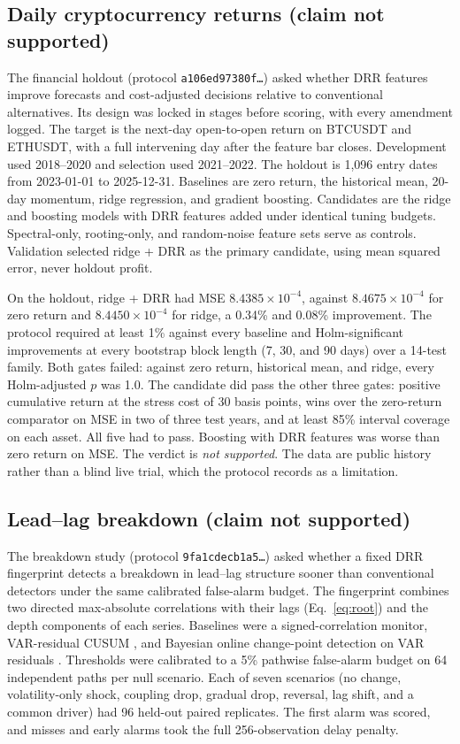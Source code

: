 \documentclass[10pt,twocolumn,letterpaper]{article}
\theoremstyle{definition}
\theoremstyle{remark}
\newcommand{\code}[1]{\texttt{#1}}
\begin{document}
\subsection{Daily cryptocurrency returns (claim not supported)}

The financial holdout (protocol \code{a106ed97380f\ldots}) asked whether DRR
features improve forecasts and cost-adjusted decisions relative to conventional
alternatives. Its design was locked in stages before scoring, with every
amendment logged. The target is the next-day open-to-open return on BTCUSDT and
ETHUSDT, with a full intervening day after the feature bar closes. Development
used 2018--2020 and selection used 2021--2022. The holdout is 1,096 entry dates
from 2023-01-01 to 2025-12-31. Baselines are zero return, the historical mean,
20-day momentum, ridge regression, and gradient boosting. Candidates are the
ridge and boosting models with DRR features added under identical tuning
budgets. Spectral-only, rooting-only, and random-noise feature sets serve as
controls. Validation selected ridge + DRR as the primary candidate, using mean
squared error, never holdout profit.

On the holdout, ridge + DRR had MSE $8.4385\times10^{-4}$, against
$8.4675\times10^{-4}$ for zero return and $8.4450\times10^{-4}$ for ridge, a
0.34\% and 0.08\% improvement. The protocol required at least 1\% against every
baseline and Holm-significant improvements at every bootstrap block length (7,
30, and 90 days) over a 14-test family. Both gates failed: against zero return,
historical mean, and ridge, every Holm-adjusted $p$ was 1.0. The candidate did
pass the other three gates: positive cumulative return at the stress cost of 30
basis points, wins over the zero-return comparator on MSE in two of three test years, and
at least 85\% interval coverage on each asset. All five had to pass. Boosting with DRR features was worse than zero return on
MSE. The verdict is \emph{not supported}. The data are public history rather
than a blind live trial, which the protocol records as a limitation.

\subsection{Lead--lag breakdown (claim not supported)}

The breakdown study (protocol \code{9fa1cdecb1a5\ldots}) asked whether a fixed
DRR fingerprint detects a breakdown in lead--lag structure sooner than
conventional detectors under the same calibrated false-alarm budget. The
fingerprint combines two directed max-absolute correlations with their lags
(Eq.~\eqref{eq:root}) and the depth components of each series. Baselines were a
signed-correlation monitor, VAR-residual CUSUM \cite{page}, and Bayesian online
change-point detection on VAR residuals \cite{adams}. Thresholds were calibrated
to a 5\% pathwise false-alarm budget on 64 independent paths per null
scenario. Each of
seven scenarios (no change, volatility-only shock, coupling drop, gradual drop,
reversal, lag shift, and a common driver) had 96 held-out paired replicates. The
first alarm was scored, and misses and early alarms took the full 256-observation
delay penalty.
\end{document}
